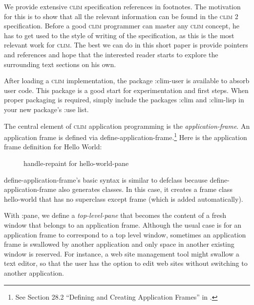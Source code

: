 \documentclass[twocolumn,a4paper]{article}
\newcommand {\concept} [1] {{\sl #1}\index{#1}}
\newcommand {\code}[1]{{\sffamily #1}}
\newcommand {\CLIM}{\textsc{clim}}
\let\class\code
\let\method\code
\let\keyword\code
\begin{document}
We provide extensive \CLIM{} specification references in
footnotes. The motivation for this is to show that all the relevant
information can be found in the \CLIM{} 2
specification\cite{clim-spec}. Before a good \CLIM{} programmer can
master any \CLIM{} concept, he has to get used to the style of writing
of the specification, as this is the most relevant work for
\CLIM{}. The best we can do in this short paper is provide pointers and
references and hope that the interested reader starts to explore the
surrounding text sections on his own.

After loading a \CLIM{} implementation, the package
\keyword{:clim-user} is available to absorb user code. This package is
a good start for experimentation and first steps. When proper
packaging is required, simply include the packages \keyword{:clim} and
\keyword{:clim-lisp} in your new package's \keyword{:use} list.

The central element of \CLIM{} application programming is the
\concept{application-frame}. An application frame is defined via
\code{define-application-frame}.\footnote{See Section 28.2 ``Defining
  and Creating Application Frames'' in \cite{clim-spec}.} Here is
the application frame definition for Hello World:
\lstset{style=inlinestyle}


\begin{figure*}
\lstset{style=framestyle}

\caption{\method{handle-repaint} for \class{hello-world-pane}}\label{hello-world-repaint}
\end{figure*}
\code{define-application-frame}'s basic syntax is similar to \code{defclass} because
\code{define-application-frame} also generates classes. In this case,
it creates a frame class \class{hello-world} that has no superclass
except \class{frame} (which is added automatically).

With \code{:pane}, we define a \concept{top-level-pane} that becomes
the content of a fresh window that belongs to an application
frame.  Although the usual case is for an application frame to
correspond to a top level window, sometimes an application frame is swallowed by another
application and only space in another existing window is
reserved. For instance, a web site management tool might swallow a
text editor, so that the user has the option to edit web sites without
switching to another application.

\end{document}
